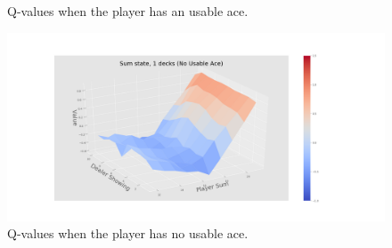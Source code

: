 \begin{center}
\begin{figure}[H]
   \caption{Q-values when the player has an usable ace. \label{sfig:3Dnd3}}
 \end{figure}
 \begin{figure}[H]%
  	 \includegraphics[width=1.2\textwidth]{./figures/noace_3D_sum_1_decks.png}
   \caption{Q-values when the player has no usable ace. \label{sfig:3Dnd4}}
 \end{figure}
\end{center}
